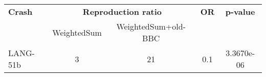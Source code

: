 \begin{tabular}{ l | c c | c c}
\hline 
\textbf{Crash} & \multicolumn{2}{c|}{\textbf{Reproduction ratio}} & \textbf{OR} & \textbf{p-value} \\ 
& WeightedSum & WeightedSum+old-BBC & & \\ 
\hline 
LANG-51b & 3 & 21 & 0.1 & 3.3670e-06 \\ 
\end{tabular}